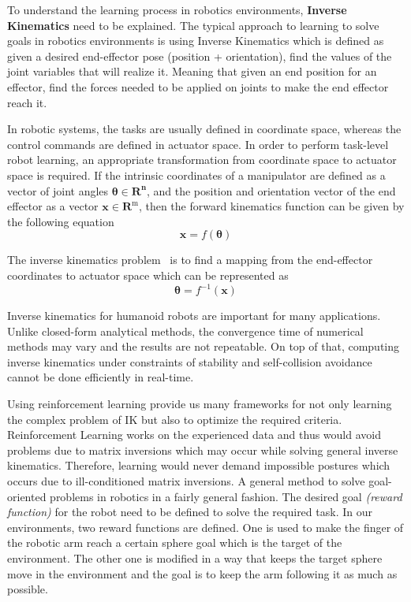 To understand the learning process in robotics environments, \textbf{Inverse Kinematics} need to be explained. The typical approach to learning to solve goals in robotics environments is using Inverse Kinematics which is defined as given a desired end-effector pose (position + orientation), find the values of the joint variables that will realize it. Meaning that given an end position for an effector, find the forces needed to be applied on joints to make the end effector reach it.

In robotic systems, the tasks are usually defined in coordinate space, whereas the control commands are defined in actuator space. In order to perform task-level robot learning, an appropriate transformation from coordinate space to actuator space is required. If the intrinsic coordinates of a manipulator are defined as a vector of joint angles \(\boldsymbol{\theta} \in \mathbf{R}^{\mathbf{n}}\), and the position and orientation vector of the end effector as a vector \(\mathbf{x} \in \mathbf{R}^{\mathrm{m}}\), then the forward kinematics function can be given by the following equation 
\begin{equation}
	        \mathbf{x}=f(\boldsymbol{\theta})
\end{equation}

The inverse kinematics problem~\parencite{colome2011smooth, chua2013robust} is to find a mapping from the end-effector coordinates to actuator space which can be represented as
\begin{equation}
	        \boldsymbol{\theta}=f^{-1}(\mathbf{x})
\end{equation}

Inverse kinematics for humanoid robots are important for many applications. Unlike closed-form analytical methods, the convergence time of numerical methods may vary and the results are not repeatable. On top of that, computing inverse kinematics under constraints of stability and self-collision avoidance cannot be done efficiently in real-time.

Using reinforcement learning provide us many frameworks for not only learning the complex problem of IK but also to optimize the required criteria. Reinforcement Learning works on the experienced data and thus would avoid problems due to matrix inversions which may occur while solving general inverse kinematics. Therefore, learning would never demand impossible postures which occurs due to ill-conditioned matrix inversions. A general method to solve goal-oriented problems in robotics in a fairly general fashion. The desired goal \textit{(reward function)} for the robot need to be defined to solve the required task. In our environments, two reward functions are defined. One is used to make the finger of the robotic arm reach a certain sphere goal which is the target of the environment. The other one is modified in a way that keeps the target sphere move in the environment and the goal is to keep the arm following it as much as possible. 


